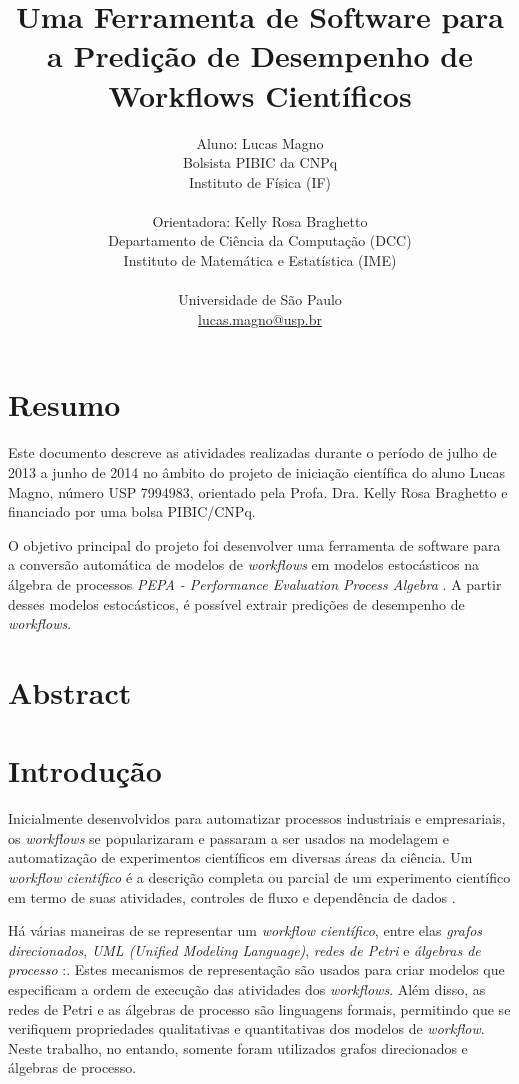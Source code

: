 \documentclass[a4paper,11pt]{article}
\date{}
\title{
    Uma Ferramenta de Software para a Predição de Desempenho de Workflows Científicos
}
\author{
    Aluno: Lucas Magno \\
    Bolsista PIBIC da CNPq \\
    Instituto de Física (IF) \\
    \\
    Orientadora: Kelly Rosa Braghetto\\
    Departamento de Ciência da Computação (DCC) \\
    Instituto de Matemática e Estatística (IME) \\
    \\
    Universidade de São Paulo \\
    \href{mailto:lucas.magno@usp.br}{lucas.magno@usp.br}
}
\begin{document}
    \maketitle
    \section*{Resumo}
    Este documento descreve as atividades realizadas durante o período de julho de 2013 a junho de 2014 no âmbito do projeto de iniciação científica do aluno Lucas Magno, número USP 7994983, orientado pela Profa. Dra. Kelly Rosa Braghetto e financiado por uma bolsa PIBIC/CNPq.

    O objetivo principal do projeto foi desenvolver uma ferramenta de software para a conversão automática de modelos de \emph{workflows} em modelos estocásticos na álgebra de processos \emph{PEPA - Performance Evaluation Process Algebra} \cite{web:pepa} . A partir desses modelos estocásticos, é possível extrair predições de desempenho de \emph{workflows}.
    \section*{Abstract}

    \newpage
    \section*{Introdução}
        Inicialmente desenvolvidos para automatizar processos industriais e empresariais, os \emph{workflows} se popularizaram e passaram a ser usados na modelagem e automatização de experimentos científicos em diversas áreas da ciência. Um \emph{workflow científico} é a descrição completa ou parcial de um experimento científico em termo de suas atividades, controles de fluxo e dependência de dados \cite{phd:gadelha12}.

        Há várias maneiras de se representar um \emph{workflow científico}, entre elas \emph{grafos direcionados}, \emph{UML \emph{(Unified Modeling Language)}}, \emph{redes de Petri} e \emph{álgebras de processo} \cite{phd:oga11}:. Estes mecanismos de representação são usados para criar modelos que especificam a ordem de execução das atividades dos \emph{workflows}. Além disso, as redes de Petri e as álgebras de processo são linguagens formais, permitindo que se verifiquem propriedades qualitativas e quantitativas dos modelos de \emph{workflow}. Neste trabalho, no entando, somente foram utilizados grafos direcionados e álgebras de processo.
\end{document}
